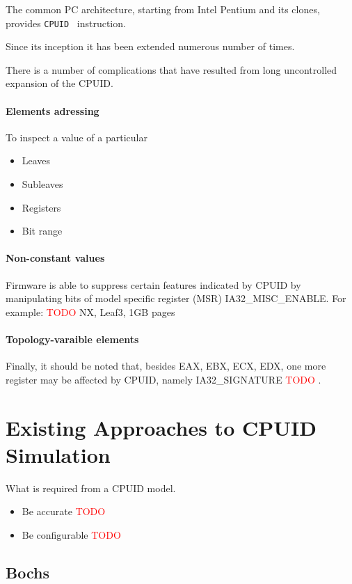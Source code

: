 \documentclass[a4paper,10pt,oneside,unicode]{article}
\newcommand{\todo}[1][]{\textcolor{red}{TODO #1}}
\begin{document}
The common PC architecture, starting from Intel Pentium and its clones, provides \texttt{CPUID}~\cite{intelmanual-7vols} instruction. 

Since its inception it has been extended numerous number of times.


There is a number of complications that have resulted from long uncontrolled expansion of the CPUID.

\paragraph{Elements adressing}

To inspect a value of a particular
\begin{itemize}
\item Leaves
\item Subleaves
\item Registers
\item Bit range
\end{itemize}


\paragraph{Non-constant values} Firmware is able to suppress certain features indicated by CPUID by manipulating bits of model specific register (MSR) IA32\_MISC\_ENABLE. For example: \todo{NX, Leaf3, 1GB pages}

\paragraph{Topology-varaible elements}

Finally, it should be noted that, besides EAX, EBX, ECX, EDX, one more register may be affected by CPUID, namely IA32\_SIGNATURE \todo.

\section{Existing Approaches to CPUID Simulation}

What is required from a CPUID model.
\begin{itemize}
\item Be accurate \todo
\item Be configurable \todo
\end{itemize}

\subsection{Bochs}
\end{document}
